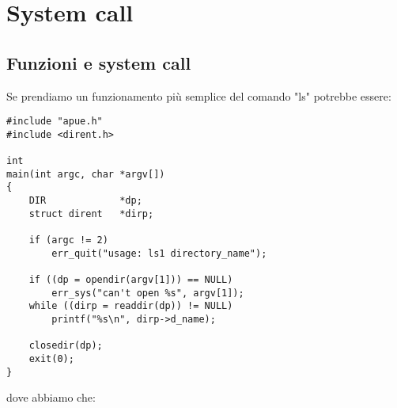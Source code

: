\newpage
\section{System call}

\subsection{Funzioni e system call}

Se prendiamo un funzionamento più semplice del comando "ls" potrebbe essere:

\begin{lstlisting}
#include "apue.h"
#include <dirent.h>

int
main(int argc, char *argv[])
{
	DIR				*dp;
	struct dirent	*dirp;

	if (argc != 2)
		err_quit("usage: ls1 directory_name");

	if ((dp = opendir(argv[1])) == NULL)
		err_sys("can't open %s", argv[1]);
	while ((dirp = readdir(dp)) != NULL)
		printf("%s\n", dirp->d_name);

	closedir(dp);
	exit(0);
}
\end{lstlisting}


dove abbiamo che:

